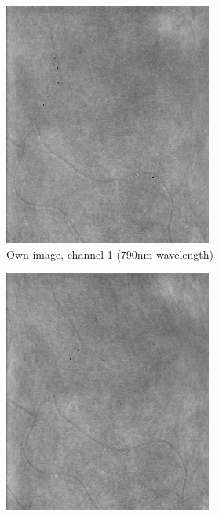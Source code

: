 \documentclass[]{article}
\begin{document}
\begin{figure}[ht]
	\centering
	\begin{subfigure}[b]{.4\textwidth}
		\centering
		\includegraphics[width=0.75\textwidth, scale=0.75]{Subject3_Session216_OD_(0,0)_1x1_980_OA850nm_marked.jpg}
		\caption{Own image, channel 1 (790nm wavelength)}
		\label{fig:own-channel-a}
	\end{subfigure}
	\hfill
	\centering
	\begin{subfigure}[b]{.4\textwidth}
		\centering
		\includegraphics[width=0.75\textwidth, scale=0.75]{Subject3_Session216_OD_(0,0)_1x1_980_OA850nm_marked_corresponding_image.jpg}

\end{subfigure}
\end{figure}
\end{document}
